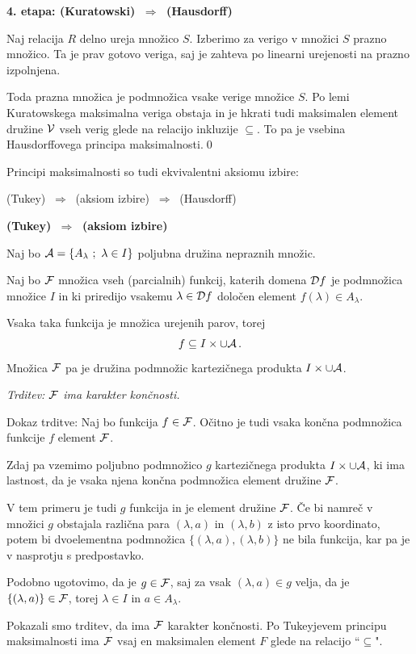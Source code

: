 \documentclass[11pt,paper=b5,footinclude,headinclude]{scrbook} %
\def\sledi {{~\Rightarrow~}}
\begin{document}
\bigskip
\textbf{4. etapa: (Kuratowski) $\sledi$ (Hausdorff)}

Naj relacija $R$ delno ureja množico $S$. Izberimo za verigo v množici $S$ prazno množico. Ta je prav gotovo veriga, saj je zahteva po linearni urejenosti na prazno izpolnjena.

Toda prazna množica je podmnožica vsake verige množice $S$. Po lemi Kuratowskega maksimalna veriga obstaja
in je
hkrati tudi maksimalen element družine ${\cal V}$ vseh verig glede na relacijo inkluzije $\subseteq$.
To pa je vsebina Hausdorffovega principa maksimalnosti.\qed

%
\bigskip

Principi maksimalnosti so tudi ekvivalentni aksiomu izbire:

(Tukey) $\sledi$ (aksiom izbire) $\sledi$ (Hausdorff)

\bigskip
\textbf{(Tukey) $\sledi$ (aksiom izbire)}

Naj bo ${\cal A} = \{A_\lambda~;~\lambda\in I\}$ poljubna družina nepraznih množic.

Naj bo ${\cal F}$ množica vseh (parcialnih) funkcij, katerih domena ${\cal D}f$ je podmnožica
množice $I$ in ki priredijo vsakemu $\lambda\in {\cal D}f$ določen element $f(\lambda)\in A_\lambda$.

Vsaka taka funkcija je množica urejenih parov, torej
$$f\subseteq I\times \cup {\cal A}\,.$$
Množica ${\cal F}$ pa je družina podmnožic kartezičnega produkta $I\times \cup {\cal A}$.

\emph{ Trditev: ${\cal F}$ ima karakter končnosti.}

Dokaz trditve: Naj bo funkcija $f\in{\cal F}$. Očitno je tudi vsaka končna podmnožica funkcije $f$ element ${\cal F}$.

Zdaj pa vzemimo poljubno podmnožico $g$ kartezičnega produkta $I\times \cup {\cal A}$,
ki ima lastnost, da je vsaka njena končna podmnožica element družine ${\cal F}$.

V tem primeru je tudi $g$ funkcija in je element družine ${\cal F}$. Če bi namreč v množici $g$ obstajala različna para $(\lambda,a)$ in $(\lambda,b)$ z isto prvo koordinato, potem bi dvoelementna podmnožica $\{(\lambda,a),(\lambda,b)\}$ ne bila funkcija, kar pa je v nasprotju s predpostavko.

Podobno ugotovimo, da je $g\in {\cal F}$, saj za vsak $(\lambda,a)\in g$ velja, da je
$\{(\lambda,a)\}\in {\cal F}$, torej $\lambda\in I$ in $a\in A_\lambda$.

Pokazali smo trditev, da ima ${\cal F}$ karakter končnosti.
Po Tukeyjevem principu maksimalnosti ima ${\cal F}$ vsaj en maksimalen element $F$ glede na relacijo ``$\subseteq$".
\end{document}
